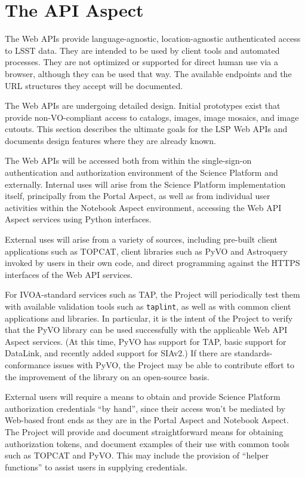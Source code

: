 \section{The API Aspect}\label{api-aspect}

The Web APIs provide language-agnostic, location-agnostic authenticated access
to LSST data.  They are intended to be used by client tools and automated
processes.  They are not optimized or supported for direct human use via a
browser, although they can be used that way.  The available endpoints and the
URL structures they accept will be documented.

The Web APIs are undergoing detailed design.  Initial prototypes exist that
provide non-VO-compliant access to catalogs, images, image mosaics, and image
cutouts.  This section describes the ultimate goals for the LSP Web APIs and
documents design features where they are already known.

The Web APIs will be accessed both from within the single-sign-on authentication
and authorization environment of the Science Platform and externally.
Internal uses will arise from the Science Platform implementation itself,
principally from the Portal Aspect, as well as from individual user activities
within the Notebook Aspect environment, accessing the Web API Aspect services
using Python interfaces.

External uses will arise from a variety of sources, including pre-built client
applications such as TOPCAT, client libraries such as PyVO and Astroquery
invoked by users in their own code, and direct programming against the
HTTPS interfaces of the Web API services.

For IVOA-standard services such as TAP, the Project will periodically test
them with available validation tools such as \texttt{taplint}, as well as
with common client applications and libraries.
In particular, it is the intent of the Project to verify that the PyVO library
can be used successfully with the applicable Web API Aspect services.
(At this time, PyVO has support for TAP, basic support for DataLink, and
recently added support for SIAv2.)
If there are standards-conformance issues with PyVO, the Project may be able
to contribute effort to the improvement of the library on an open-source basis.

External users will require a means to obtain and provide Science Platform
authorization credentials ``by hand'', since their access won't be mediated by
Web-based front ends as they are in the Portal Aspect and Notebook Aspect.
The Project will provide and document straightforward means for obtaining
authorization tokens, and document examples of their use with common tools
such as TOPCAT and PyVO.
This may include the provision of ``helper functions'' to assist users in
supplying credentials.

